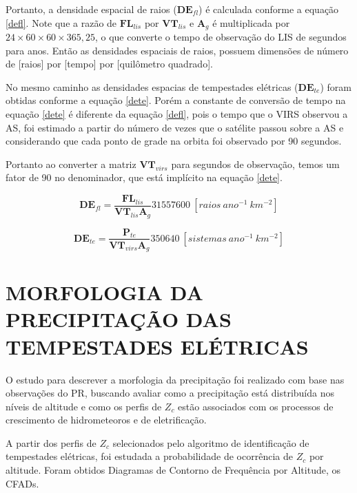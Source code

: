 Portanto, a densidade espacial de raios ($\mathbf{DE}_{fl}$) é calculada conforme a equação \ref{defl}. Note que a razão de $\mathbf{FL}_{lis}$ por $\mathbf{VT}_{lis}$ e $\mathbf{A}_g$ é multiplicada por $24\times60\times60\times365,25$, o que converte o tempo de observação do LIS de segundos para anos. Então as densidades espaciais de raios, possuem dimensões de número de [raios] por [tempo] por [quilômetro quadrado].

No mesmo caminho as densidades espacias de tempestades elétricas ($\mathbf{DE}_{te}$) foram obtidas conforme a equação \ref{dete}. Porém a constante de conversão de tempo na equação \ref{dete} é diferente da equação \ref{defl}, pois o tempo que o VIRS observou a AS, foi estimado a partir do número de vezes que o satélite passou sobre a AS e considerando que cada ponto de grade na orbita foi observado por 90 segundos. 

Portanto ao converter a matriz $\mathbf{VT}_{virs}$ para segundos de observação, temos um fator de 90 no denominador, que está implícito na equação \ref{dete}. 


\begin{equation}
\mathbf{DE}_{fl} = \frac{\mathbf{FL}_{lis}}{\mathbf{VT}_{lis} \mathbf{A}_g} 31557600 ~[raios~ano^{-1}~km^{-2}]    
\label{defl}
\end{equation}

\begin{equation}
\mathbf{DE}_{te} = \frac{\mathbf{P}_{te}}{\mathbf{VT}_{virs} \mathbf{A}_g} 350640 ~[sistemas~ano^{-1}~km^{-2}]    
\label{dete}
\end{equation}

\section{MORFOLOGIA DA PRECIPITAÇÃO DAS TEMPESTADES ELÉTRICAS}


O estudo para descrever a morfologia da precipitação foi realizado com base nas observações do PR, buscando avaliar como a precipitação está distribuída nos níveis de altitude e como os perfis de $Z_c$ estão associados com os processos de crescimento de hidrometeoros e de eletrificação.  

A partir dos perfis de $Z_c$ selecionados pelo algoritmo de identificação de tempestades elétricas, foi estudada a probabilidade de ocorrência de $Z_c$ por altitude. Foram obtidos Diagramas de Contorno de Frequência por Altitude, os CFADs.

